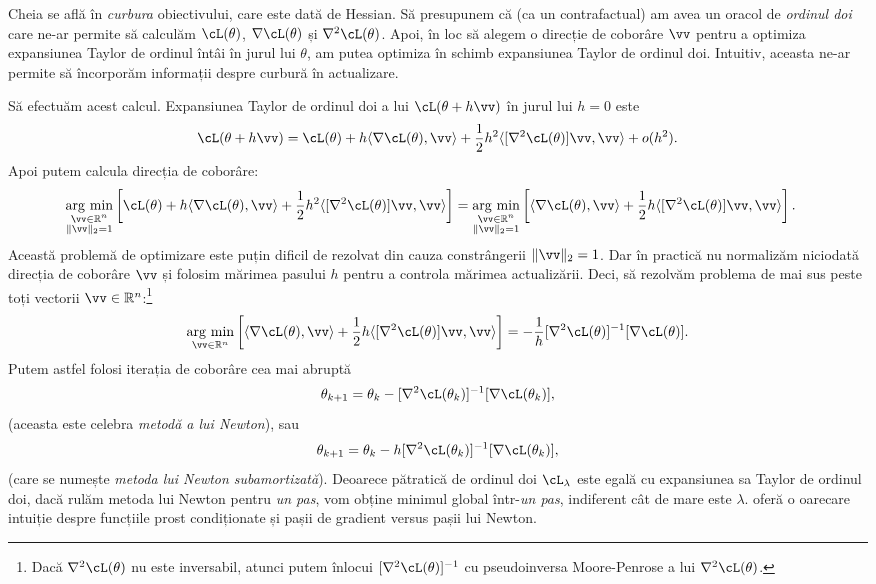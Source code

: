 \documentclass[../../book-main_ro.tex]{subfiles}
\begin{document}
Cheia se află în \textit{curbura} obiectivului, care este dată de Hessian. Să presupunem că (ca un contrafactual) am avea un oracol de \textit{ordinul doi} care ne-ar permite să calculăm \(\cL(\theta)\), \(\nabla \cL(\theta)\) și \(\nabla^{2}\cL(\theta)\). Apoi, în loc să alegem o direcție de coborâre \(\vv\) pentru a optimiza expansiunea Taylor de ordinul întâi în jurul lui \(\theta\), am putea optimiza în schimb expansiunea Taylor de ordinul doi. Intuitiv, aceasta ne-ar permite să încorporăm informații despre curbură în actualizare.

Să efectuăm acest calcul. Expansiunea Taylor de ordinul doi a lui \(\cL(\theta + h\vv)\) în jurul lui \(h = 0\) este
\begin{equation}
    \cL(\theta + h\vv) = \cL(\theta) + h\ip{\nabla \cL(\theta)}{\vv} + \frac{1}{2}h^{2}\ip{[\nabla^{2}\cL(\theta)]\vv}{\vv} + o(h^{2}).
\end{equation}
Apoi putem calcula direcția de coborâre:
\begin{align}
    \argmin_{\substack{\vv \in \R^{n} \\ \norm{\vv}_{2} = 1}}\bs{\cL(\theta) + h\ip{\nabla \cL(\theta)}{\vv} + \frac{1}{2}h^{2}\ip{[\nabla^{2}\cL(\theta)]\vv}{\vv}} 
    &= \argmin_{\substack{\vv \in \R^{n} \\ \norm{\vv}_{2} = 1}}\bs{\ip{\nabla \cL(\theta)}{\vv} + \frac{1}{2}h\ip{[\nabla^{2}\cL(\theta)]\vv}{\vv}}.
\end{align}
Această problemă de optimizare este puțin dificil de rezolvat din cauza constrângerii \(\norm{\vv}_{2} = 1\). Dar în practică nu normalizăm niciodată direcția de coborâre \(\vv\) și folosim mărimea pasului \(h\) pentru a controla mărimea actualizării. Deci, să rezolvăm problema de mai sus peste toți vectorii \(\vv \in \R^{n}\):\footnote{Dacă \(\nabla^{2}\cL(\theta)\) nu este inversabil, atunci putem înlocui \([\nabla^{2}\cL(\theta)]^{-1}\) cu pseudoinversa Moore-Penrose a lui \(\nabla^{2}\cL(\theta)\).}
\begin{equation}
    \argmin_{\vv \in \R^{n}}\bs{\ip{\nabla \cL(\theta)}{\vv} + \frac{1}{2}h\ip{[\nabla^{2}\cL(\theta)]\vv}{\vv}} = -\frac{1}{h}[\nabla^{2}\cL(\theta)]^{-1}[\nabla \cL(\theta)].
\end{equation}
Putem astfel folosi iterația de coborâre cea mai abruptă
\begin{equation}
    \theta_{k + 1} = \theta_{k} - [\nabla^{2}\cL(\theta_{k})]^{-1}[\nabla \cL(\theta_{k})],
\end{equation}
(aceasta este celebra \textit{metodă a lui Newton}), sau
\begin{equation}
    \theta_{k + 1} = \theta_{k} - h[\nabla^{2}\cL(\theta_{k})]^{-1}[\nabla \cL(\theta_{k})],
\end{equation}
(care se numește \textit{metoda lui Newton subamortizată}). Deoarece pătratică de ordinul doi \(\cL_{\lambda}\) este egală cu expansiunea sa Taylor de ordinul doi, dacă rulăm metoda lui Newton pentru \textit{un pas}, vom obține minimul global într-\textit{un pas}, indiferent cât de mare este \(\lambda\).  oferă o oarecare intuiție despre funcțiile prost condiționate și pașii de gradient versus pașii lui Newton.
\end{document}
